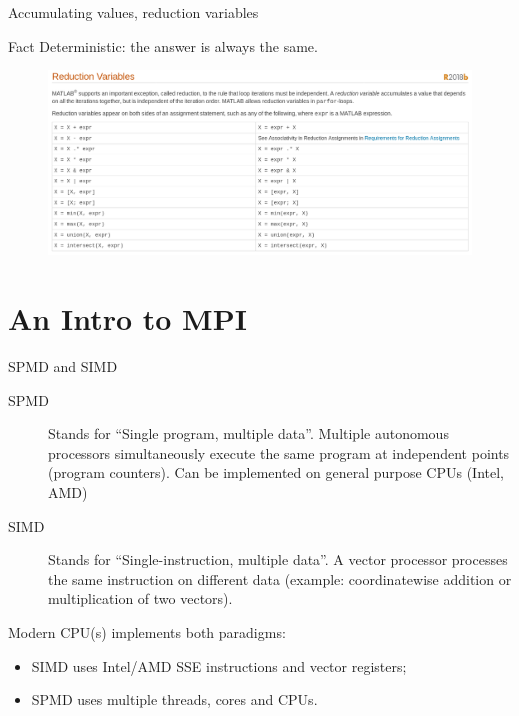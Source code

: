 \documentclass[pdflatex,colorlinks,landscape]{beamer}
\renewcommand\emph[1]{{\color{magenta}#1}}
\begin{document}
\begin{frame}[allowframebreaks]{Accumulating values, reduction variables}
  \begin{small}
    
  \end{small}
  \begin{tiny}
  \end{tiny}
  \begin{block}{Fact}
    Deterministic: the answer is always the same.
  \end{block}

  \begin{figure}
    \includegraphics[width=\textwidth]{MATLAB/ReductionVariables.png}
  \end{figure}
\end{frame}

\section{An Intro to MPI}
\begin{frame}{SPMD and SIMD}
  \begin{description}
  \item[SPMD] Stands for ``Single program, multiple data''. \emph{Multiple
    autonomous processors} simultaneously execute the same program at
    independent points (program counters). Can be implemented on general
    purpose CPUs (Intel, AMD)
  \item[SIMD] Stands for ``Single-instruction, multiple data''.  A
    \emph{vector processor} processes the same instruction on different
    data (example: coordinatewise addition or multiplication of two
    vectors).
  \end{description}
  Modern CPU(s) implements \emph{both paradigms}:
  \begin{itemize}
  \item SIMD uses Intel/AMD \emph{SSE instructions} and \emph{vector registers};
  \item SPMD uses multiple \emph{threads}, \emph{cores} and CPUs.
  \end{itemize}
\end{frame}
\end{document}
